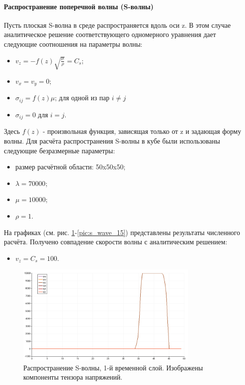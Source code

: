 \paragraph{Распространение поперечной волны (S-волны)}
Пусть плоская S-волна в среде распространяется вдоль оси z. В этом случае аналитическое решение соответствующего одномерного уравнения дает следующие соотношения на параметры волны:
\begin{itemize}
\item $v_z=-f(z)\sqrt{\frac{\mu}{\rho}}=C_s$;
\item $v_x=v_y=0$;
\item $\sigma_{ij}=f(z)\mu$; для одной из пар $i \neq j$
\item $\sigma_{ij}=0$ для $i = j$.
\end{itemize}
Здесь $f(z)$ - произвольная функция, зависящая только от z и задающая форму волны.
Для расчёта распространения S-волны в кубе были использованы следующие безразмерные параметры: 
\begin{itemize}
\item размер расчётной области: 50x50x50;
\item $\lambda=70000$;
\item $\mu=10000$;
\item $\rho=1$.
\end{itemize}
На графиках (см. рис.
\ref{pic:s_wave_1}-\ref{pic:s_wave_15}) представлены результаты численного расчёта. Получено совпадение скорости волны с аналитическим решением:
\begin{itemize}
\item $v_z=C_s=100$.
\end{itemize}

\begin{figure}[htp]
\centering
\includegraphics[width=0.8\textwidth]{png/s-wave-test/s/0001.png}
\caption{Распространение S-волны, 1-й временной слой. Изображены компоненты тензора напряжений.}
\label{pic:s_wave_1}
\end{figure}

